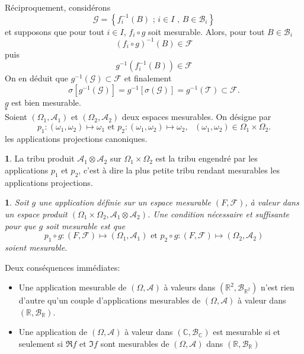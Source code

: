 \documentclass[8pt,notheorems]{beamer}
\def \R{\mathbb R}
\newtheorem{prop}{\translate{Proposition}}
\theoremstyle{definition}
\newtheorem{definition}{\translate{Definition}}
\theoremstyle{example}
\theoremstyle{mystyle}
\theoremstyle{plain}
\begin{document}
\begin{frame}[allowframebreaks]
Réciproquement, considérons 
$$
\mathcal{G} = \left\{f_i^{-1}(B)\text{ ; }i\in I\text{ , }B\in\mathcal{B}_i\right\}
$$
et supposons que pour tout $i\in I$, $f_i\circ g$ soit mesurable. Alors, pour tout $B\in\mathcal{B}_i$
$$
(f_i\circ g)^{-1}(B)\in \mathcal{F} 
$$
puis 
$$
g^{-1}(f_i^{-1}(B))\in \mathcal{F}
$$
On en déduit que $g^{-1}(\mathcal{G})\subset\mathcal{F}$ et finalement
$$
\sigma\left[g^{-1}(\mathcal{G})\right] = g^{-1}\left[\sigma(\mathcal{G})\right] = g^{-1}(\mathcal{T})\subset\mathcal{F} . 
$$
$g$ est bien mesurable.\\
$\square$\\
Soient $(\Omega_1,\mathcal{A}_1)$ et $(\Omega_2,\mathcal{A}_2)$ deux espaces mesurables. On désigne par 
$$
p_1:(\omega_1,\omega_2)\mapsto \omega_1\text{ et }p_2:(\omega_1,\omega_2)\mapsto \omega_2,\text{ }(\omega_1,\omega_2)\in \Omega_1\times \Omega_2.
$$
les applications projections canoniques. 
\begin{definition}
La tribu produit $\mathcal{A}_1\otimes \mathcal{A}_2$ sur $\Omega_1\times \Omega_2$ est la tribu engendré par les applications $p_1$ et $p_2$, c'est à dire la plus petite tribu rendant mesurables les applications projections. 
\end{definition}
\begin{prop}
Soit $g$ une application définie sur un espace mesurable $(F, \mathcal{F})$, à valeur dans un espace produit $(\Omega_1\times \Omega_2, \mathcal{A}_1\otimes \mathcal{A}_2)$. Une condition nécessaire et suffisante pour que $g$ soit mesurable est que 
$$
p_1\circ g:(F,\mathcal{F})\mapsto (\Omega_1,\mathcal{A}_1)\text{ et }p_2\circ g:(F,\mathcal{F})\mapsto (\Omega_2,\mathcal{A}_2)
$$
soient mesurable.
\end{prop}
Deux conséquences immédiates:
\begin{itemize}
    \item Une application mesurable de $(\Omega,\mathcal{A})$ à valeurs dans $(\R^2,\mathcal{B}_{\R^2})$ n'est rien d'autre qu'un couple d'applications mesurables de $(\Omega, \mathcal{A})$ à valeur dans $(\mathbb{R},\mathcal{B}_{\R})$. 
    \item Une application de $(\Omega,\mathcal{A})$ à valeur dans $(\mathbb{C},\mathcal{B}_{\mathbb{C}})$ est mesurable si et seulement si $\Re f$ et $\Im f$ sont mesurables de $(\Omega,\mathcal{A})$ dans $(\R,\mathcal{B}_\R)$
\end{itemize}
\end{frame}
\end{document}
